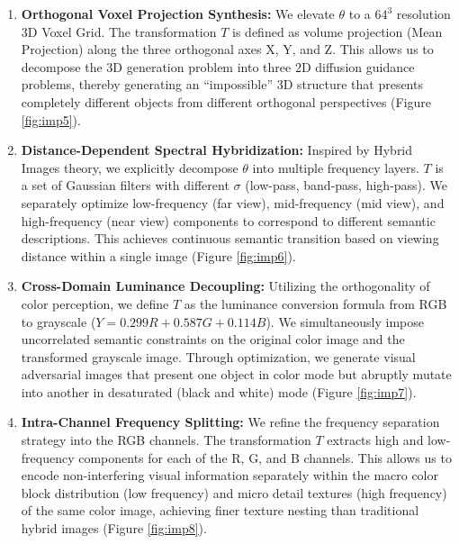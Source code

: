 \documentclass{article}
\begin{document}
\begin{enumerate}
    \item \textbf{Orthogonal Voxel Projection Synthesis:} We elevate $\theta$ to a $64^3$ resolution 3D Voxel Grid. The transformation $T$ is defined as volume projection (Mean Projection) along the three orthogonal axes X, Y, and Z. This allows us to decompose the 3D generation problem into three 2D diffusion guidance problems, thereby generating an ``impossible'' 3D structure that presents completely different objects from different orthogonal perspectives (Figure \ref{fig:imp5}).

    \item \textbf{Distance-Dependent Spectral Hybridization:} Inspired by Hybrid Images theory, we explicitly decompose $\theta$ into multiple frequency layers. $T$ is a set of Gaussian filters with different $\sigma$ (low-pass, band-pass, high-pass). We separately optimize low-frequency (far view), mid-frequency (mid view), and high-frequency (near view) components to correspond to different semantic descriptions. This achieves continuous semantic transition based on viewing distance within a single image (Figure \ref{fig:imp6}).

    \item \textbf{Cross-Domain Luminance Decoupling:} Utilizing the orthogonality of color perception, we define $T$ as the luminance conversion formula from RGB to grayscale ($Y = 0.299R + 0.587G + 0.114B$). We simultaneously impose uncorrelated semantic constraints on the original color image and the transformed grayscale image. Through optimization, we generate visual adversarial images that present one object in color mode but abruptly mutate into another in desaturated (black and white) mode (Figure \ref{fig:imp7}).

    \item \textbf{Intra-Channel Frequency Splitting:} We refine the frequency separation strategy into the RGB channels. The transformation $T$ extracts high and low-frequency components for each of the R, G, and B channels. This allows us to encode non-interfering visual information separately within the macro color block distribution (low frequency) and micro detail textures (high frequency) of the same color image, achieving finer texture nesting than traditional hybrid images (Figure \ref{fig:imp8}).
\end{enumerate}
\end{document}
